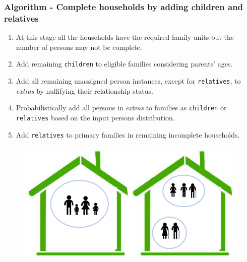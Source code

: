 \begin{frame}%
  \frametitle{Algorithm - Complete households by adding children and relatives}%
  \begin{enumerate}%
    \setlength\itemsep{1em}%
    \conti%
    \item At this stage all the households have the required family units but
    the number of persons may not be complete.%
    \item Add remaining \texttt{children} to eligible families considering
    parents' ages.%
    \item Add all remaining unassigned person instances, except for
    \texttt{relatives}, to \textit{extras} by nullifying their relationship
    status.%
    \item Probabilistically add all persons in \textit{extras} to families as
    \texttt{children} or \texttt{relatives} based on the input persons
    distribution.%
    \item Add \texttt{relatives} to primary families in remaining incomplete
    households.%
  \end{enumerate}%
  \begin{figure}
    \centering
    \includegraphics[scale=0.3]{images/add-rels-child}
  \end{figure}
\end{frame}%

